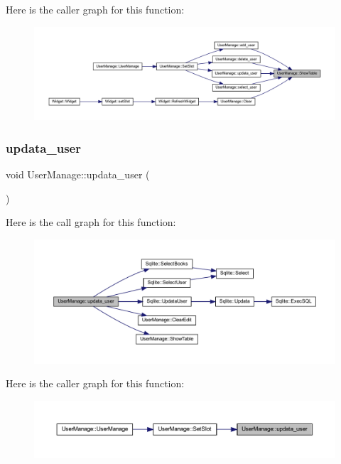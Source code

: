 Here is the caller graph for this function\+:
\nopagebreak
\begin{figure}[H]
\begin{center}
\leavevmode
\includegraphics[width=350pt]{class_user_manage_aa0a2437c0e95fb846c0e5a237d848af2_icgraph}
\end{center}
\end{figure}
\mbox{\label{class_user_manage_ab7f81e5e1f3d9944c551401dba37693f}} 
\subsubsection{\texorpdfstring{updata\_user}{updata\_user}}
{\footnotesize\ttfamily void User\+Manage\+::updata\+\_\+user (\begin{DoxyParamCaption}{ }\end{DoxyParamCaption})\hspace{0.3cm}{\ttfamily [slot]}}

Here is the call graph for this function\+:
\nopagebreak
\begin{figure}[H]
\begin{center}
\leavevmode
\includegraphics[width=350pt]{class_user_manage_ab7f81e5e1f3d9944c551401dba37693f_cgraph}
\end{center}
\end{figure}
Here is the caller graph for this function\+:
\nopagebreak
\begin{figure}[H]
\begin{center}
\leavevmode
\includegraphics[width=350pt]{class_user_manage_ab7f81e5e1f3d9944c551401dba37693f_icgraph}
\end{center}
\end{figure}



